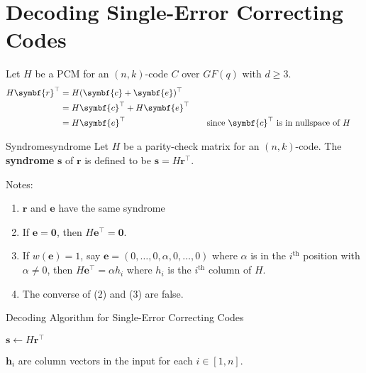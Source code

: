 \section{Decoding Single-Error Correcting Codes}
Let $ H $ be a PCM for an $ (n,k) $-code $ C $ over $ GF(q) $
with $ d\geqslant 3 $.
\begin{align*}
    H\symbf{r}^\top
     & =H(\symbf{c}+\symbf{e})^\top                                                                         \\
     & =H\symbf{c}^\top+H \symbf{e}^\top                                                                    \\
     & =H\symbf{e}^\top                  & \quad & \text{since $ \symbf{c}^\top $ is in nullspace of $ H$ }
\end{align*}

\begin{Definition}{Syndrome}{syndrome}
    Let $ H $ be a parity-check matrix for an $ (n,k) $-code.
    The \textbf{syndrome} $ \symbf{s} $ of $ \symbf{r} $
    is defined to be $ \symbf{s}=H\symbf{r}^\top $.
\end{Definition}

Notes:
\begin{enumerate}[label=(\arabic*)]
    \item $ \symbf{r} $ and $ \symbf{e} $ have the same syndrome
    \item If $ \symbf{e}=\symbf{0} $, then $ H\symbf{e}^\top=\symbf{0} $.
    \item If $ w(\symbf{e})=1 $, say $ \symbf{e}=(0,\ldots,0,\alpha,0,\ldots,0) $
          where $ \alpha $ is in the $ i^{\text{th}} $ position with $ \alpha \neq 0 $,
          then $ H\symbf{e}^\top=\alpha h_i $ where $ h_i $ is the $ i^{\text{th}} $
          column of $ H $.
    \item The converse of (2) and (3) are false.
\end{enumerate}

\begin{algorithm}
    \DontPrintSemicolon{}
    \caption{Decoding Algorithm for Single-Error Correcting Codes}\label{alg:Decoding Algorithm for Single-Error Correcting Codes}

    $ \symbf{s}\gets H\symbf{r}^\top $\;
     {
    }
     {
         {
        }
    }
    \Return{}
\end{algorithm}
\begin{Remark}{}{}
    $ \symbf{h}_i $ are column vectors in the input for each $ i\in[1,n] $.
\end{Remark}

